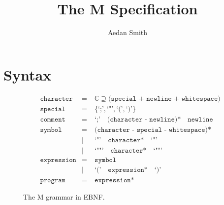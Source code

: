 \documentclass{article}
\title{The M Specification}
\author{Aedan Smith}
\begin{document}
    \maketitle
    \newpage

    \tableofcontents
    \newpage

    \section{Syntax}\label{sec:syntax}

    \begin{figure}[h]
        \centering
        \begin{align*}
            &\texttt{character} &=&\;\mathbb{C}\supseteq\texttt{(special + newline + whitespace)}\\
            &\texttt{special}   &=&\;\{\texttt{`;'},\texttt{`"'},\texttt{`('},\texttt{`)'}\}\\
            &\texttt{comment}   &=&\;\texttt{`;'}\quad\texttt{(character - newline)*}\quad\texttt{newline}\\
            &\texttt{symbol}    &=&\;\texttt{(character - special - whitespace)*}\\
            & &|&\;\texttt{`"'}\quad\texttt{character*}\quad\texttt{`"'}\\
            & &|&\;\texttt{`""'}\quad\texttt{character*}\quad\texttt{`""'}\\
            &\texttt{expression}&=&\;\texttt{symbol}\\
            & &|&\;\texttt{`('}\quad\texttt{expression*}\quad\texttt{`)'}\\
            &\texttt{program}   &=&\;\texttt{expression*}
        \end{align*}
        \caption{The M grammar in EBNF.}
    \end{figure}
\end{document}
